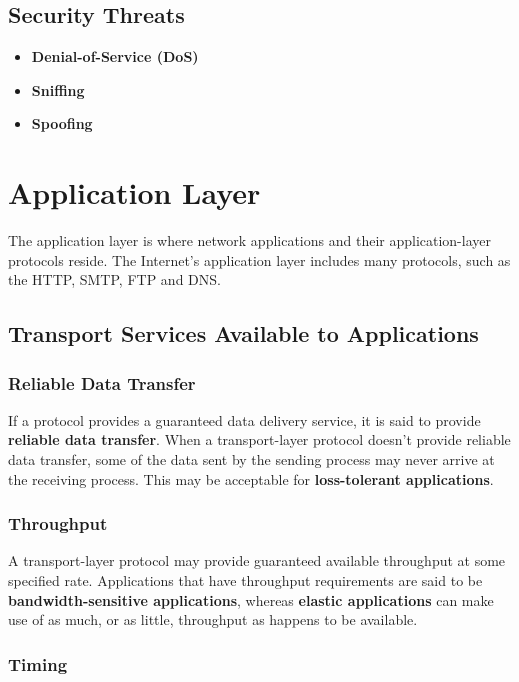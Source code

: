 \documentclass[11pt]{article}
\begin{document}
\subsection{Security Threats}

\begin{itemize}
	\item \textbf{Denial-of-Service (DoS)}
	\item \textbf{Sniffing}
	\item \textbf{Spoofing}
\end{itemize}

\section{Application Layer}

The application layer is where network applications and their application-layer protocols reside. The Internet's application layer includes many protocols, such as the HTTP, SMTP, FTP and DNS.

\subsection{Transport Services Available to Applications}

\subsubsection{Reliable Data Transfer}

If a protocol provides a guaranteed data delivery service, it is said to provide \textbf{reliable data transfer}. When a transport-layer protocol doesn’t provide reliable data transfer, some of the data sent by the sending process may never arrive at the receiving process. This may be acceptable for \textbf{loss-tolerant applications}.

\subsubsection{Throughput}

A transport-layer protocol may provide guaranteed available throughput at some specified rate. Applications that have throughput requirements are said to be \textbf{bandwidth-sensitive applications}, whereas \textbf{elastic applications} can make use of as much, or as little, throughput as happens to be available.

\subsubsection{Timing}
\end{document}
